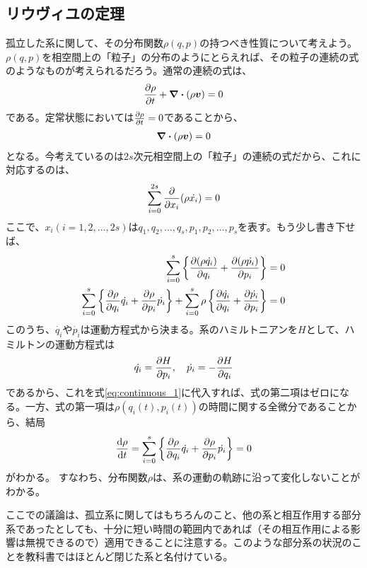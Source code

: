\documentclass[uplatex,dvipdfmx]{jsarticle}
\begin{document}
    \subsection{リウヴィユの定理}  
        孤立した系に関して、その分布関数$\rho(q,p)$の持つべき性質について考えよう。
        $\rho(q,p)$を相空間上の「粒子」の分布のようにとらえれば、その粒子の連続の式のようなものが考えられるだろう。通常の連続の式は、
        \begin{align}
            \pdv{\rho}{t}+\div(\rho \vb*{v}) = 0
        \end{align}
        である。定常状態においては$\pdv{\rho}{t}=0$であることから、
        \begin{align}
            \div(\rho \vb*{v}) = 0            
        \end{align}
        となる。今考えているのは$2s$次元相空間上の「粒子」の連続の式だから、これに対応するのは、
        \begin{align}
            \sum_{i=0}^{2s} \pdv{x_i}(\rho \dot{x_i}) = 0
        \end{align}
        ここで、$x_i(i=1,2,\dots, 2s)$は$q_1,q_2, \dots ,q_s, p_1, p_2, \dots, p_s$を表す。もう少し書き下せば、
        \begin{align}
            \sum_{i=0}^s \left\{ \pdv{(\rho \dot{q_i})}{q_i} + \pdv{(\rho\dot{p_i})}{p_i} \right\} &= 0 \\
            \sum_{i=0}^s \left\{ \pdv{\rho}{q_i}\dot{q_i} + \pdv{\rho}{p_i} \dot{p_i} \right\} 
            + \sum_{i=0}^s \rho \left\{ \pdv{\dot{q_i}}{q_i} + \pdv{\dot{p_i}}{p_i}\right\} &= 0 \label{eq:continuous_1}
        \end{align}
        このうち、$\dot{q_i}$や$\dot{p_i}$は運動方程式から決まる。系のハミルトニアンを$H$として、ハミルトンの運動方程式は
        \begin{align}
            \dot{q_i} = \pdv{H}{p_i} \qc \dot{p_i} = -\pdv{H}{q_i}            
        \end{align}
        であるから、これを式\eqref{eq:continuous_1}に代入すれば、式の第二項はゼロになる。一方、式の第一項は$\rho(q_i(t), p_i(t))$の時間に関する全微分であることから、結局
        \begin{align}
            \dv{\rho}{t} = \sum_{i=0}^s \left\{ \pdv{\rho}{q_i}\dot{q_i} + \pdv{\rho}{p_i} \dot{p_i} \right\} = 0
        \end{align}
        がわかる。
        すなわち、分布関数$\rho$は、系の運動の軌跡に沿って変化しないことがわかる。
        
        ここでの議論は、孤立系に関してはもちろんのこと、他の系と相互作用する部分系であったとしても、十分に短い時間の範囲内であれば（その相互作用による影響は無視できるので）適用できることに注意する。このような部分系の状況のことを教科書ではほとんど閉じた系と名付けている。
\end{document}
